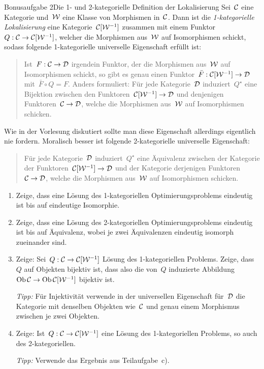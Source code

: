 \documentclass{uebblatt}
\begin{document}
\begin{aufgabe*}{Bonusaufgabe 2}{Die 1- und 2-kategorielle Definition der Lokalisierung}
Sei~$\mathcal{C}$ eine Kategorie und~$\mathcal{W}$ eine Klasse von Morphismen in~$\mathcal{C}$. Dann ist
die \emph{1-kategorielle Lokalisierung} eine Kategorie~$\mathcal{C}[\mathcal{W}^{-1}]$ zusammen
mit einem Funktor~$Q : \mathcal{C} \to \mathcal{C}[\mathcal{W}^{-1}]$, welcher die Morphismen aus~$\mathcal{W}$ auf
Isomorphismen schickt, sodass folgende 1-kategorielle universelle Eigenschaft
erfüllt ist:
\begin{quote}Ist~$F : \mathcal{C} \to \mathcal{D}$ irgendein Funktor, der die Morphismen aus~$\mathcal{W}$
auf Isomorphismen schickt, so gibt es genau einen Funktor~$\bar F : \mathcal{C}[\mathcal{W}^{-1}]
\to \mathcal{D}$ mit~$\bar F \circ Q = F$. Anders formuliert: Für jede Kategorie~$\mathcal{D}$
induziert~$Q^\star$ eine Bijektion zwischen den Funktoren~$\mathcal{C}[\mathcal{W}^{-1}] \to \mathcal{D}$
und denjenigen Funktoren~$\mathcal{C} \to \mathcal{D}$, welche die Morphismen aus~$\mathcal{W}$ auf
Isomorphismen schicken.
\end{quote}
Wie in der Vorlesung diskutiert sollte man diese Eigenschaft allerdings
eigentlich nie fordern. Moralisch besser ist folgende 2-kategorielle
universelle Eigenschaft:
\begin{quote}
Für jede Kategorie~$\mathcal{D}$ induziert~$Q^\star$ eine Äquivalenz zwischen der
Kategorie der Funktoren~$\mathcal{C}[\mathcal{W}^{-1}] \to \mathcal{D}$ und der Kategorie derjenigen
Funktoren~$\mathcal{C} \to \mathcal{D}$, welche die Morphismen aus~$\mathcal{W}$ auf Isomorphismen
schicken.
\end{quote}
\begin{enumerate}
\item Zeige, dass eine Lösung des 1-kategoriellen Optimierungsproblems
eindeutig ist bis auf eindeutige Isomorphie.
\item Zeige, dass eine Lösung des 2-kategoriellen Optimierungsproblems
eindeutig ist bis auf Äquivalenz, wobei je zwei Äquivalenzen eindeutig isomorph
zueinander sind.
\item Zeige: Sei~$Q : \mathcal{C} \to \mathcal{C}[\mathcal{W}^{-1}]$ Lösung des 1-kategoriellen Problems.
Zeige, dass~$Q$ auf Objekten bijektiv ist, dass also die von~$Q$ induzierte
Abbildung~$\operatorname{Ob} \mathcal{C} \to \operatorname{Ob} \mathcal{C}[\mathcal{W}^{-1}]$ bijektiv ist.

\emph{Tipp:} Für Injektivität verwende in der universellen Eigenschaft für~$\mathcal{D}$
die Kategorie mit denselben Objekten wie~$\mathcal{C}$ und genau einem Morphismus
zwischen je zwei Objekten.
\item Zeige: Ist~$Q : \mathcal{C} \to \mathcal{C}[\mathcal{W}^{-1}]$ eine Lösung des 1-kategoriellen
Problems, so auch des 2-kategoriellen.

\emph{Tipp:} Verwende das Ergebnis aus Teilaufgabe~c).
\end{enumerate}
\end{aufgabe*}
\end{document}
